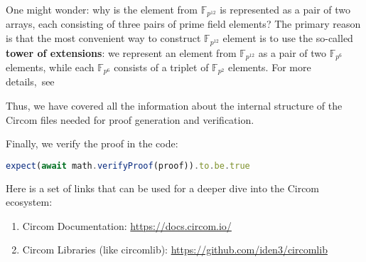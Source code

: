 \documentclass[../lecture-notes-148x210.tex]{subfiles}
\begin{document}
\begin{remark}
    One might wonder: why is the element from $\mathbb{F}_{p^{12}}$ is represented as a pair of two arrays,
    each consisting of three pairs of prime field elements? The primary reason is that the most convenient
    way to construct $\mathbb{F}_{p^{12}}$ element is to use the so-called \textbf{tower of extensions}: we represent
    an element from $\mathbb{F}_{p^{12}}$ as a pair of two $\mathbb{F}_{p^6}$ elements, while each $\mathbb{F}_{p^6}$
    consists of a triplet of $\mathbb{F}_{p^2}$ elements. For more details,~see~
\end{remark}

Thus, we have covered all the information about the internal structure of the Circom files needed for proof generation and verification.

Finally, we verify the proof in the code:
\begin{lstlisting}[language=TypeScript,numbers=none,basicstyle=\footnotesize\ttfamily\normalsize]
expect(await math.verifyProof(proof)).to.be.true
\end{lstlisting}
\begin{remark}
    \vspace{-1em}
    Here is a set of links that can be used for a deeper dive into the Circom ecosystem:
    \begin{enumerate}
        \item Circom Documentation: \url{https://docs.circom.io/}
        \item Circom Libraries (like circomlib): \url{https://github.com/iden3/circomlib}
    \end{enumerate}
\end{remark}
\end{document}
